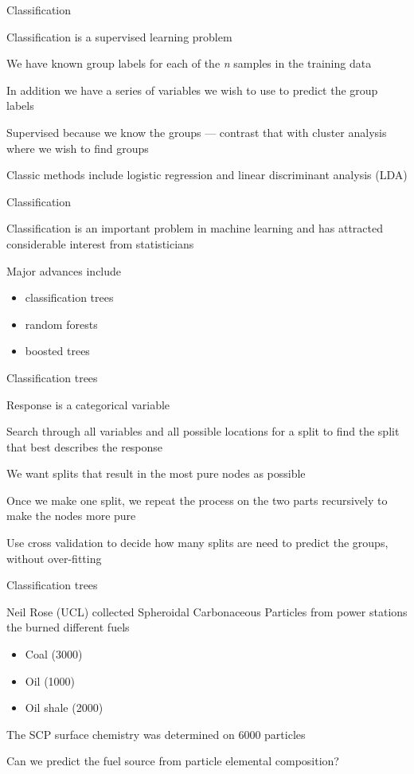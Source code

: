 \documentclass[11pt,ignorenonframetext,compress, aspectratio=169]{beamer}
\providecommand{\tightlist}{%
  \setlength{\itemsep}{0pt}\setlength{\parskip}{0pt}}
\begin{document}
\begin{frame}{Classification}

Classification is a supervised learning problem

We have known group labels for each of the \emph{n} samples in the
training data

In addition we have a series of variables we wish to use to predict the
group labels

Supervised because we know the groups --- contrast that with cluster
analysis where we wish to find groups

Classic methods include logistic regression and linear discriminant
analysis (LDA)

\end{frame}

\begin{frame}{Classification}

Classification is an important problem in machine learning and has
attracted considerable interest from statisticians

Major advances include

\begin{itemize}
\tightlist
\item
  classification trees
\item
  random forests
\item
  boosted trees
\end{itemize}

\end{frame}

\begin{frame}{Classification trees}

Response is a categorical variable

Search through all variables and all possible locations for a split to
find the split that best describes the response

We want splits that result in the most pure nodes as possible

Once we make one split, we repeat the process on the two parts
recursively to make the nodes more pure

Use cross validation to decide how many splits are need to predict the
groups, without over-fitting

\end{frame}

\begin{frame}{Classification trees}

Neil Rose (UCL) collected Spheroidal Carbonaceous Particles from power
stations the burned different fuels

\begin{itemize}
\tightlist
\item
  Coal (3000)
\item
  Oil (1000)
\item
  Oil shale (2000)
\end{itemize}

The SCP surface chemistry was determined on 6000 particles

Can we predict the fuel source from particle elemental composition?

\end{frame}
\end{document}
